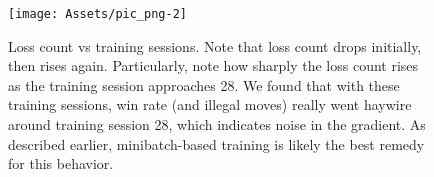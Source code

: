 \begin{figure}[b]
	\centering
	\texttt{[image: Assets/pic\_png-2]}
	\caption{Loss count vs training sessions.
    Note that loss count drops initially, then rises again.
    Particularly, note how sharply the loss count rises as the training session approaches 28.
    We found that with these training sessions, win rate (and illegal moves) really went haywire around training session 28, which indicates noise in the gradient.
   	As described earlier, minibatch-based training is likely the best remedy for this behavior.}
	\label{fig:LossesvTraining}
\end{figure}